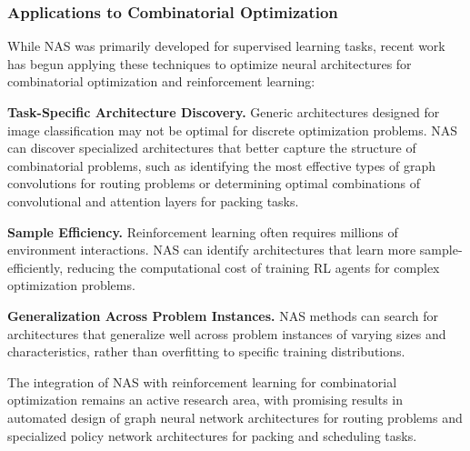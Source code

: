 \subsubsection{Applications to Combinatorial Optimization}

While NAS was primarily developed for supervised learning tasks, recent work has begun applying these techniques to optimize neural architectures for combinatorial optimization and reinforcement learning:

\textbf{Task-Specific Architecture Discovery.} Generic architectures designed for image classification may not be optimal for discrete optimization problems. NAS can discover specialized architectures that better capture the structure of combinatorial problems, such as identifying the most effective types of graph convolutions for routing problems or determining optimal combinations of convolutional and attention layers for packing tasks.

\textbf{Sample Efficiency.} Reinforcement learning often requires millions of environment interactions. NAS can identify architectures that learn more sample-efficiently, reducing the computational cost of training RL agents for complex optimization problems.

\textbf{Generalization Across Problem Instances.} NAS methods can search for architectures that generalize well across problem instances of varying sizes and characteristics, rather than overfitting to specific training distributions.

The integration of NAS with reinforcement learning for combinatorial optimization remains an active research area, with promising results in automated design of graph neural network architectures for routing problems and specialized policy network architectures for packing and scheduling tasks.
